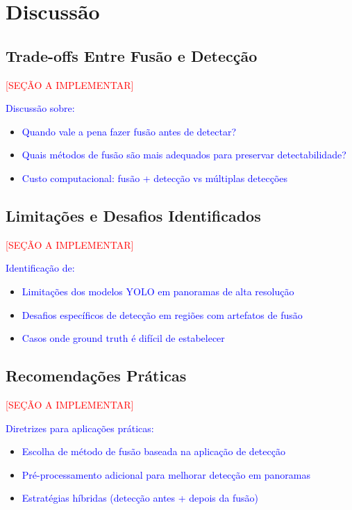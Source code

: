 \section{Discussão}

\subsection{Trade-offs Entre Fusão e Detecção}

\textcolor{red}{[SEÇÃO A IMPLEMENTAR]}

\textcolor{blue}{Discussão sobre:}
\begin{itemize}
    \item \textcolor{blue}{Quando vale a pena fazer fusão antes de detectar?}
    \item \textcolor{blue}{Quais métodos de fusão são mais adequados para preservar detectabilidade?}
    \item \textcolor{blue}{Custo computacional: fusão + detecção vs múltiplas detecções}
\end{itemize}

\subsection{Limitações e Desafios Identificados}

\textcolor{red}{[SEÇÃO A IMPLEMENTAR]}

\textcolor{blue}{Identificação de:}
\begin{itemize}
    \item \textcolor{blue}{Limitações dos modelos YOLO em panoramas de alta resolução}
    \item \textcolor{blue}{Desafios específicos de detecção em regiões com artefatos de fusão}
    \item \textcolor{blue}{Casos onde ground truth é difícil de estabelecer}
\end{itemize}

\subsection{Recomendações Práticas}

\textcolor{red}{[SEÇÃO A IMPLEMENTAR]}

\textcolor{blue}{Diretrizes para aplicações práticas:}
\begin{itemize}
    \item \textcolor{blue}{Escolha de método de fusão baseada na aplicação de detecção}
    \item \textcolor{blue}{Pré-processamento adicional para melhorar detecção em panoramas}
    \item \textcolor{blue}{Estratégias híbridas (detecção antes + depois da fusão)}
\end{itemize}

